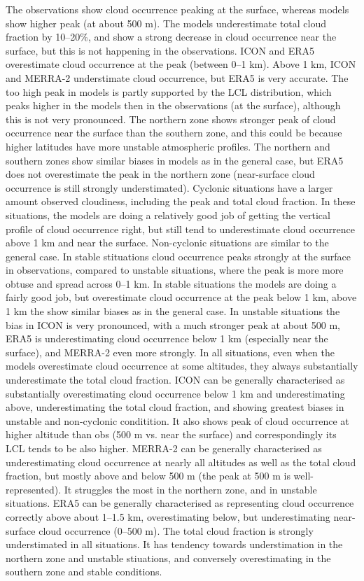 \documentclass[12pt,a4paper]{article}
\begin{document}
The observations show cloud occurrence peaking at the surface, whereas models
show higher peak (at about 500 m). The models underestimate total cloud
fraction by 10--20\%, and show a strong decrease in cloud occurrence near the
surface, but this is not happening in the observations. ICON and ERA5
overestimate cloud occurrence at the peak (between 0--1 km). Above 1 km, ICON
and MERRA-2 understimate cloud occurrence, but ERA5 is very accurate. The too
high peak in models is partly supported by the LCL distribution, which peaks
higher in the models then in the observations (at the surface), although this
is not very pronounced. The northern zone shows stronger peak of cloud
occurrence near the surface than the southern zone, and this could be because
higher latitudes have more unstable atmospheric profiles. The northern and
southern zones show similar biases in models as in the general case, but ERA5
does not overestimate the peak in the northern zone (near-surface cloud
occurrence is still strongly understimated). Cyclonic situations have a larger
amount observed cloudiness, including the peak and total cloud fraction. In
these situations, the models are doing a relatively good job of getting the
vertical profile of cloud occurrence right, but still tend to underestimate
cloud occurrence above 1 km and near the surface. Non-cyclonic situations are
similar to the general case. In stable stituations cloud occurrence peaks
strongly at the surface in observations, compared to unstable situations, where
the peak is more more obtuse and spread across 0--1 km. In stable situations
the models are doing a fairly good job, but overestimate cloud occurrence at
the peak below 1 km, above 1 km the show similar biases as in the general case.
In unstable situations the bias in ICON is very pronounced, with a much
stronger peak at about 500 m, ERA5 is underestimating cloud occurrence below 1
km (especially near the surface), and MERRA-2 even more strongly. In all
situations, even when the models overestimate cloud occurrence at some
altitudes, they always substantially underestimate the total cloud fraction.
ICON can be generally characterised as substantially overestimating cloud
occurrence below 1 km and underestimating above, underestimating the total
cloud fraction, and showing greatest biases in unstable and non-cyclonic
conditition. It also shows peak of cloud occurrence at higher altitude than obs
(500 m vs. near the surface) and correspondingly its LCL tends to be also
higher. MERRA-2 can be generally characterised as underestimating cloud
occurrence at nearly all altitudes as well as the total cloud fraction, but
mostly above and below 500 m (the peak at 500 m is well-represented). It
struggles the most in the northern zone, and in unstable situations. ERA5 can
be generally characterised as representing cloud occurrence correctly above
about 1--1.5 km, overestimating below, but underestimating near-surface cloud
occurrence (0--500 m). The total cloud fraction is strongly understimated in
all situations. It has tendency towards understimation in the northern zone and
unstable stiuations, and conversely overestimating in the southern zone and
stable conditions.
\end{document}
